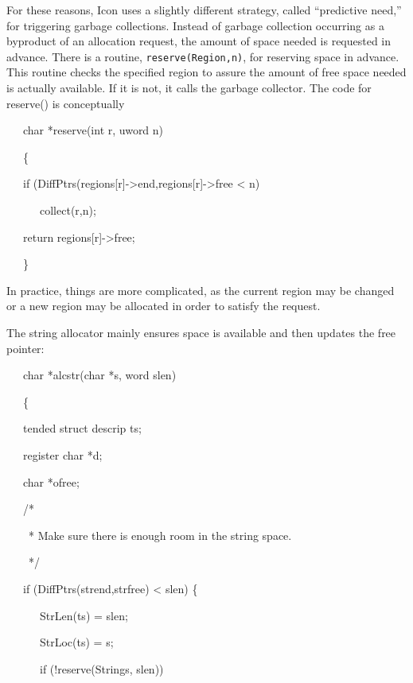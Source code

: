 For these reasons, Icon uses a slightly different strategy, called
``predictive need,'' for triggering garbage collections. Instead of
garbage collection occurring as a byproduct of an allocation request,
the amount of space needed is requested in advance. There is a
routine, \texttt{reserve(Region,n)}, for reserving space in
advance. This routine checks the specified region to assure the amount
of free space needed is actually available. If it is not, it calls the
garbage collector. The code for reserve() is conceptually

{\ttfamily\mdseries
\ \ \ char *reserve(int r, uword n)}

{\ttfamily\mdseries
\ \ \ \{}

{\ttfamily\mdseries
\ \ \ if (DiffPtrs(regions[r]-{\textgreater}end,regions[r]-{\textgreater}free {\textless} n)}

{\ttfamily\mdseries
\ \ \ \ \ \ collect(r,n);}

{\ttfamily\mdseries
\ \ \ return regions[r]-{\textgreater}free;}

{\ttfamily\mdseries
\ \ \ \}}


In practice, things are more complicated, as the current region may be
changed or a new region may be allocated in order to satisfy the
request.


The string allocator mainly ensures space is available and then
updates the free pointer:

{\ttfamily\mdseries
\ \ \ char *alcstr(char *s, word slen)}

{\ttfamily\mdseries
\ \ \ \{}

{\ttfamily\mdseries
\ \ \ tended struct descrip ts;
}

{\ttfamily\mdseries
\ \ \ register char *d;
}

{\ttfamily\mdseries
\ \ \ char *ofree;
}


\bigskip

{\ttfamily\mdseries
\ \ \ /*
}

{\ttfamily\mdseries
\ \ \ \ * Make sure there is enough room in the string space.}

{\ttfamily\mdseries
\ \ \ \ */
}

{\ttfamily\mdseries
\ \ \ if (DiffPtrs(strend,strfree) {\textless} slen) \{
}

{\ttfamily\mdseries
\ \ \ \ \ \ StrLen(ts) = slen;
}

{\ttfamily\mdseries
\ \ \ \ \ \ StrLoc(ts) = s;
}

{\ttfamily\mdseries
\ \ \ \ \ \ if (!reserve(Strings, slen))
}

